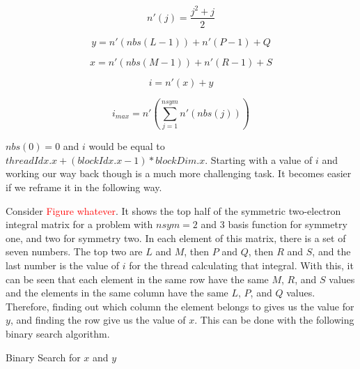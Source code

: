 \documentclass[12pt]{book}
\newcommand{\notetodylan}[1]{\textcolor{red}{#1}} %
\begin{document}
\begin{equation}
\label{nprime}
n'(j) = \frac{j^{2}+j}{2}
\end{equation}

\begin{equation}
\label{xlpq}
y = n'(nbs(L - 1)) + n'(P - 1) + Q
\end{equation}

\begin{equation}
\label{ymrs}
x = n'(nbs(M - 1)) + n'(R - 1) + S
\end{equation}

\begin{equation}
\label{numtothread}
i = n'(x) + y
\end{equation}

\begin{equation}
\label{imax}
i_{max} = n'(\sum^{nsym}_{j = 1}n'(nbs(j)))
\end{equation}

$nbs(0) = 0$ and $i$ would be equal to $threadIdx.x + (blockIdx.x - 1) * blockDim.x$. Starting with a value of $i$ and working our way back though is a much more challenging task. It becomes easier if we reframe it in the following way.

Consider \notetodylan{Figure whatever}. It shows the top half of the symmetric two-electron integral matrix for a problem with $nsym = 2$ and 3 basis function for symmetry one, and two for symmetry two. In each element of this matrix, there is a set of seven numbers. The top two are $L$ and $M$, then $P$ and $Q$, then $R$ and $S$, and the last number is the value of $i$ for the thread calculating that integral. With this, it can be seen that each element in the same row have the same $M$, $R$, and $S$ values and the elements in the same column have the same $L$, $P$, and $Q$ values. Therefore, finding out which column the element belongs to gives us the value for $y$, and finding the row give us the value of $x$. This can be done with the following binary search algorithm. 

\begin{algorithm}
\caption{Binary Search for $x$ and $y$}
\label{bsxy}
\begin{algorithmic}

\ENDIF


		\ENDIF
	\ENDWHILE
\ENDIF

\end{algorithmic}
\end{algorithm}
\end{document}
